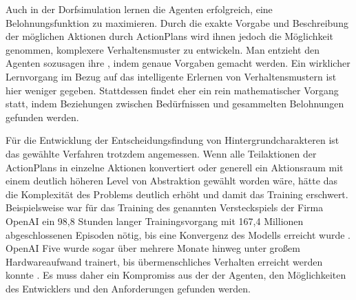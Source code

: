Auch in der Dorfsimulation lernen die Agenten erfolgreich, eine Belohnungsfunktion zu maximieren. Durch die exakte Vorgabe und Beschreibung der möglichen Aktionen durch ActionPlans wird ihnen jedoch die Möglichkeit genommen, komplexere Verhaltensmuster zu entwickeln. Man entzieht den Agenten sozusagen ihre , indem genaue Vorgaben gemacht werden. Ein wirklicher Lernvorgang im Bezug auf das intelligente Erlernen von Verhaltensmustern ist hier weniger gegeben. Stattdessen findet eher ein rein mathematischer Vorgang statt, indem Beziehungen zwischen Bedürfnissen und gesammelten Belohnungen gefunden werden.

Für die Entwicklung der Entscheidungsfindung von Hintergrundcharakteren ist das gewählte Verfahren trotzdem angemessen. Wenn alle Teilaktionen der ActionPlans in einzelne Aktionen konvertiert oder generell ein Aktionsraum mit einem deutlich höheren Level von Abstraktion gewählt worden wäre, hätte das die Komplexität des Problems deutlich erhöht und damit das Training erschwert. Beispielsweise war für das Training des genannten Versteckspiels der Firma OpenAI ein 98,8 Stunden langer Trainingsvorgang mit 167,4 Millionen abgeschlossenen Episoden nötig, bis eine Konvergenz des Modells erreicht wurde \cite{hide_and_seek_openai_paper}. OpenAI Five wurde sogar über mehrere Monate hinweg unter großem Hardwareaufwand trainert, bis übermenschliches Verhalten erreicht werden konnte \cite{openai_five_paper}. Es muss daher ein Kompromiss aus der  der Agenten, den Möglichkeiten des Entwicklers und den Anforderungen gefunden werden.





